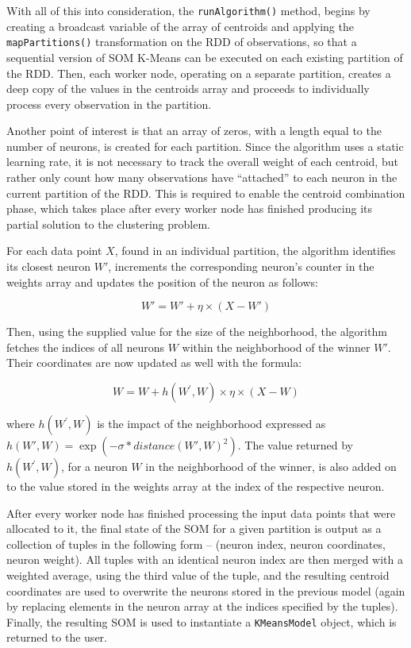 \documentclass{l4proj}
\begin{document}
With all of this into consideration, the \texttt{runAlgorithm()} method, begins by creating a broadcast variable of the array of centroids and applying the \texttt{mapPartitions()} transformation on the RDD of observations, so that a sequential version of SOM K-Means can be executed on each existing partition of the RDD. Then, each worker node, operating on a separate partition, creates a deep copy of the values in the centroids array and proceeds to individually process every observation in the partition. 

Another point of interest is that an array of zeros, with a length equal to the number of neurons, is created for each partition. Since the algorithm uses a static learning rate, it is not necessary to track the overall weight of each centroid, but rather only count how many observations have ``attached'' to each neuron in the current partition of the RDD. This is required to enable the centroid combination phase, which takes place after every worker node has finished producing its partial solution to the clustering problem.

For each data point $X$, found in an individual partition, the algorithm identifies its closest neuron $W'$, increments the corresponding neuron's counter in the weights array and updates the position of the neuron as follows:

$$W' = W' + \eta\times(X-W')$$

\noindent Then, using the supplied value for the size of the neighborhood, the algorithm fetches the indices of all neurons $W$ within the neighborhood of the winner $W'$. Their coordinates are now updated as well with the formula:

$$W = W + h(W^{\prime},W)\times\eta\times(X-W)$$

\noindent where $h(W^{\prime},W)$ is the impact of the neighborhood expressed as $h(W',W) = \exp(-\sigma*distance(W', W)^2)$. The value returned by $h(W^{\prime},W)$, for a neuron $W$ in the neighborhood of the winner, is also added on to the value stored in the weights array at the index of the respective neuron.

After every worker node has finished processing the input data points that were allocated to it, the final state of the SOM for a given partition is output as a collection of tuples in the following form -- (neuron index, neuron coordinates, neuron weight). All tuples with an identical neuron index are then merged with a weighted average, using the third value of the tuple, and the resulting centroid coordinates are used to overwrite the neurons stored in the previous model (again by replacing elements in the neuron array at the indices specified by the tuples). Finally, the resulting SOM is used to instantiate a \texttt{KMeansModel} object, which is returned to the user.
\end{document}

